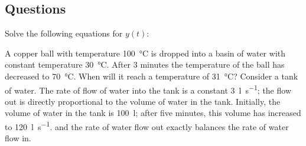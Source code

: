 \subsection*{Questions}
\begin{questions}
  \question Solve the following equations for $ y(t) $:
  \question A copper ball with temperature \SI{100}{\celsius} is dropped into a basin of water with constant temperature
            \SI{30}{\celsius}. After 3 minutes the temperature of the ball has decreased to \SI{70}{\celsius}. When will
            it reach a temperature of \SI{31}{\celsius}?
  \question Consider a tank of water. The rate of flow of water into the tank is a constant \SI{3}{\litre\per\second};
            the flow out is directly proportional to the volume of water in the tank. Initially, the volume of water
            in the tank is \SI{100}{\litre}; after five minutes, this volume has increased to \SI{120}{\litre\per\second}.
            and the rate of water flow out exactly balances the rate of water flow in.
\end{questions}


